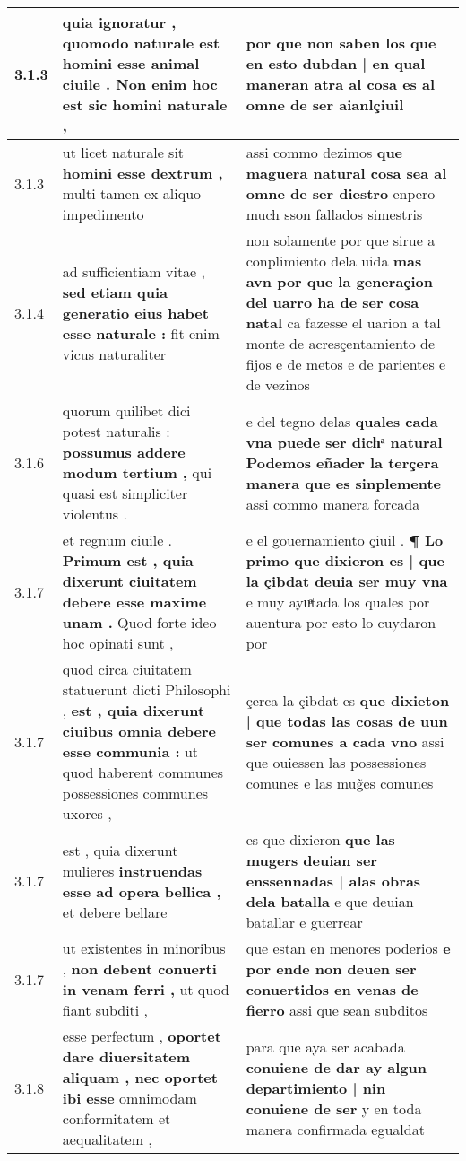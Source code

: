 \begin{tabular}{|p{1cm}|p{6.5cm}|p{6.5cm}|}
3.1.3 & quia ignoratur , \textbf{ quomodo naturale est homini esse animal ciuile . } Non enim hoc est sic homini naturale , & por que non saben los \textbf{ que en esto dubdan | en qual maneran atra al cosa es al omne de ser } aianlçiuil \\\hline
3.1.3 & ut licet naturale sit \textbf{ homini esse dextrum , } multi tamen ex aliquo impedimento & assi commo dezimos \textbf{ que maguera natural cosa sea al omne de ser diestro } enpero much sson fallados simestris \\\hline
3.1.4 & ad sufficientiam vitae , \textbf{ sed etiam quia generatio eius habet esse naturale : } fit enim vicus naturaliter & non solamente por que sirue a conplimiento dela uida \textbf{ mas avn por que la generaçion del uarro ha de ser cosa natal } ca fazesse el uarion a tal monte de acresçentamiento de fijos e de metos e de parientes e de vezinos \\\hline
3.1.6 & quorum quilibet dici potest naturalis : \textbf{ possumus addere modum tertium , } qui quasi est simpliciter violentus . & e del tegno delas \textbf{ quales cada vna puede ser dichͣ natural Podemos eñader la terçera manera que es sinplemente } assi commo manera forcada \\\hline
3.1.7 & et regnum ciuile . \textbf{ Primum est , quia dixerunt ciuitatem debere esse maxime unam . } Quod forte ideo hoc opinati sunt , & e el gouernamiento çiuil . \textbf{ ¶ Lo primo que dixieron es | que la çibdat deuia ser muy vna } e muy ayuͣtada los quales por auentura por esto lo cuydaron por \\\hline
3.1.7 & quod circa ciuitatem statuerunt dicti Philosophi , \textbf{ est , quia dixerunt ciuibus omnia debere esse communia : } ut quod haberent communes possessiones communes uxores , & çerca la çibdat es \textbf{ que dixieton | que todas las cosas de uun ser comunes a cada vno } assi que ouiessen las possessiones comunes e las mug̃es comunes \\\hline
3.1.7 & est , quia dixerunt mulieres \textbf{ instruendas esse ad opera bellica , } et debere bellare & es que dixieron \textbf{ que las mugers deuian ser enssennadas | alas obras dela batalla } e que deuian batallar e guerrear \\\hline
3.1.7 & ut existentes in minoribus , \textbf{ non debent conuerti in venam ferri , } ut quod fiant subditi , & que estan en menores poderios \textbf{ e por ende non deuen ser conuertidos en venas de fierro } assi que sean subditos \\\hline
3.1.8 & esse perfectum , \textbf{ oportet dare diuersitatem aliquam , nec oportet ibi esse } omnimodam conformitatem et aequalitatem , & para que aya ser acabada \textbf{ conuiene de dar ay algun departimiento | nin conuiene de ser } y en toda manera confirmada egualdat \\\hline

\end{tabular}
